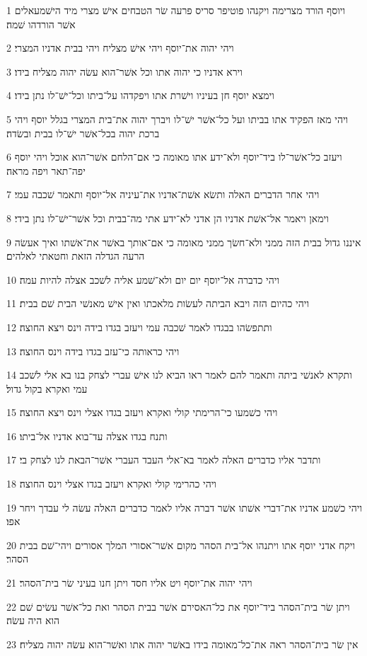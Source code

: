\par 1 ויוסף הורד מצרימה ויקנהו פוטיפר סריס פרעה שׂר הטבחים אישׁ מצרי מיד הישׁמעאלים אשׁר הורדהו שׁמה׃
\par 2 ויהי יהוה את־יוסף ויהי אישׁ מצליח ויהי בבית אדניו המצרי׃
\par 3 וירא אדניו כי יהוה אתו וכל אשׁר־הוא עשׂה יהוה מצליח בידו׃
\par 4 וימצא יוסף חן בעיניו וישׁרת אתו ויפקדהו על־ביתו וכל־ישׁ־לו נתן בידו׃
\par 5 ויהי מאז הפקיד אתו בביתו ועל כל־אשׁר ישׁ־לו ויברך יהוה את־בית המצרי בגלל יוסף ויהי ברכת יהוה בכל־אשׁר ישׁ־לו בבית ובשׂדה׃
\par 6 ויעזב כל־אשׁר־לו ביד־יוסף ולא־ידע אתו מאומה כי אם־הלחם אשׁר־הוא אוכל ויהי יוסף יפה־תאר ויפה מראה׃
\par 7 ויהי אחר הדברים האלה ותשׂא אשׁת־אדניו את־עיניה אל־יוסף ותאמר שׁכבה עמי׃
\par 8 וימאן ויאמר אל־אשׁת אדניו הן אדני לא־ידע אתי מה־בבית וכל אשׁר־ישׁ־לו נתן בידי׃
\par 9 איננו גדול בבית הזה ממני ולא־חשׂך ממני מאומה כי אם־אותך באשׁר את־אשׁתו ואיך אעשׂה הרעה הגדלה הזאת וחטאתי לאלהים׃
\par 10 ויהי כדברה אל־יוסף יום יום ולא־שׁמע אליה לשׁכב אצלה להיות עמה׃
\par 11 ויהי כהיום הזה ויבא הביתה לעשׂות מלאכתו ואין אישׁ מאנשׁי הבית שׁם בבית׃
\par 12 ותתפשׂהו בבגדו לאמר שׁכבה עמי ויעזב בגדו בידה וינס ויצא החוצה׃
\par 13 ויהי כראותה כי־עזב בגדו בידה וינס החוצה׃
\par 14 ותקרא לאנשׁי ביתה ותאמר להם לאמר ראו הביא לנו אישׁ עברי לצחק בנו בא אלי לשׁכב עמי ואקרא בקול גדול׃
\par 15 ויהי כשׁמעו כי־הרימתי קולי ואקרא ויעזב בגדו אצלי וינס ויצא החוצה׃
\par 16 ותנח בגדו אצלה עד־בוא אדניו אל־ביתו׃
\par 17 ותדבר אליו כדברים האלה לאמר בא־אלי העבד העברי אשׁר־הבאת לנו לצחק בי׃
\par 18 ויהי כהרימי קולי ואקרא ויעזב בגדו אצלי וינס החוצה׃
\par 19 ויהי כשׁמע אדניו את־דברי אשׁתו אשׁר דברה אליו לאמר כדברים האלה עשׂה לי עבדך ויחר אפו׃
\par 20 ויקח אדני יוסף אתו ויתנהו אל־בית הסהר מקום אשׁר־אסורי המלך אסורים ויהי־שׁם בבית הסהר׃
\par 21 ויהי יהוה את־יוסף ויט אליו חסד ויתן חנו בעיני שׂר בית־הסהר׃
\par 22 ויתן שׂר בית־הסהר ביד־יוסף את כל־האסירם אשׁר בבית הסהר ואת כל־אשׁר עשׂים שׁם הוא היה עשׂה׃
\par 23 אין שׂר בית־הסהר ראה את־כל־מאומה בידו באשׁר יהוה אתו ואשׁר־הוא עשׂה יהוה מצליח׃

